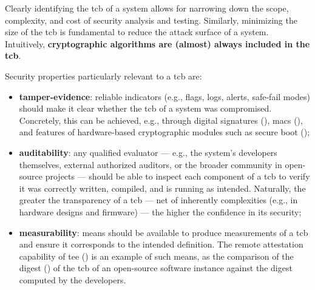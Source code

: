 
Clearly identifying the \gls{tcb} of a system allows for narrowing down the scope, complexity, and cost of security analysis and testing. Similarly, minimizing the size of the \gls{tcb} is fundamental to reduce the attack surface of a system. Intuitively, \textbf{cryptographic algorithms are (almost) always included in the \gls{tcb}}.


Security properties particularly relevant to a \gls{tcb} are:
\begin{itemize}
	\item \textbf{tamper-evidence}: reliable indicators (e.g., flags, logs, alerts, safe‑fail modes) should make it clear whether the \gls{tcb} of a system was compromised. Concretely, this can be achieved, e.g., through digital signatures (), \glspl{mac} (), and features of hardware-based cryptographic modules such as secure boot ();
	\item \textbf{auditability}: any qualified evaluator --- e.g., the system's developers themselves, external authorized auditors, or the broader community in open-source projects --- should be able to inspect each component of a \gls{tcb} to verify it was correctly written, compiled, and is running as intended. Naturally, the greater the transparency of a \gls{tcb} --- net of inherently complexities (e.g., in hardware designs and firmware) --- the higher the confidence in its security;
	\item \textbf{measurability}: means should be available to produce measurements of a \gls{tcb} and ensure it corresponds to the intended definition. The remote attestation capability of \gls{tee} () is an example of such means, as the comparison of the digest () of the \gls{tcb} of an open-source software instance against the digest computed by the developers.
\end{itemize}

